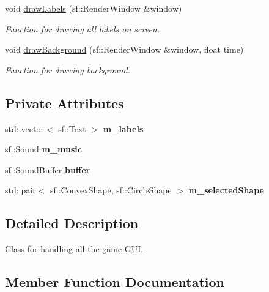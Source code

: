 \begin{DoxyCompactItemize}
void \hyperlink{classGameGUI_a8ae01b61120a2ced28870b1dee114013}{draw\+Labels} (sf\+::\+Render\+Window \&window)
\begin{DoxyCompactList}\small\item\em Function for drawing all labels on screen. \end{DoxyCompactList}\item 
void \hyperlink{classGameGUI_aa15ba3d892cacafe2beca0e60e4d23b6}{draw\+Background} (sf\+::\+Render\+Window \&window, float time)
\begin{DoxyCompactList}\small\item\em Function for drawing background. \end{DoxyCompactList}\end{DoxyCompactItemize}
\subsection*{Private Attributes}
\begin{DoxyCompactItemize}
\item 
std\+::vector$<$ sf\+::\+Text $>$ {\bfseries m\+\_\+labels}\hypertarget{classGameGUI_af9c3ff8190a66d2a437c18f13d63db46}{}\label{classGameGUI_af9c3ff8190a66d2a437c18f13d63db46}

\item 
sf\+::\+Sound {\bfseries m\+\_\+music}\hypertarget{classGameGUI_a6ad18c6cecb44eb2187c521791ab0fc2}{}\label{classGameGUI_a6ad18c6cecb44eb2187c521791ab0fc2}

\item 
sf\+::\+Sound\+Buffer {\bfseries buffer}\hypertarget{classGameGUI_a19d023daa1c61a962b3862c84a11f012}{}\label{classGameGUI_a19d023daa1c61a962b3862c84a11f012}

\item 
std\+::pair$<$ sf\+::\+Convex\+Shape, sf\+::\+Circle\+Shape $>$ {\bfseries m\+\_\+selected\+Shape}\hypertarget{classGameGUI_a9211e2c9849a45768f697f690d35dd12}{}\label{classGameGUI_a9211e2c9849a45768f697f690d35dd12}

\end{DoxyCompactItemize}


\subsection{Detailed Description}
Class for handling all the game G\+UI. 

\subsection{Member Function Documentation}
